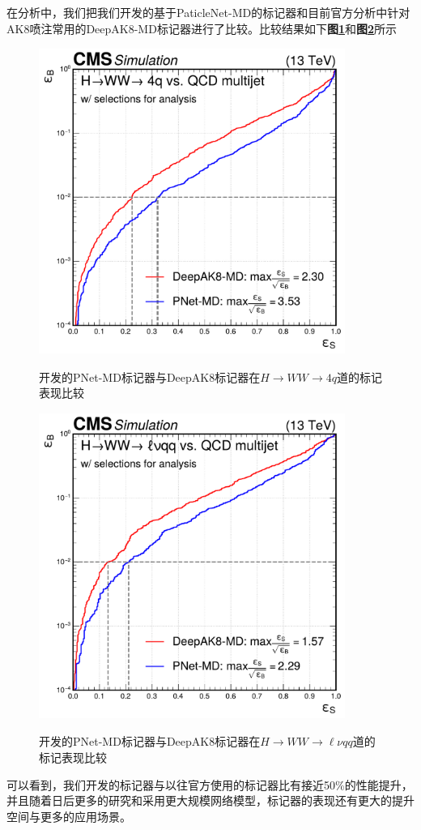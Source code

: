 在分析中，我们把我们开发的基于PaticleNet-MD的标记器和目前官方分析中针对AK8喷注常用的DeepAK8-MD标记器进行了比较。比较结果如下\textbf{图\ref{fig:5.6}}和\textbf{图\ref{fig:5.7}}所示
\begin{figure}[H]
 \centering\label{fig:5.6}
 \caption{开发的PNet-MD标记器与DeepAK8标记器在$H\to WW\to4q$道的标记表现比较}
 \includegraphics[height=10cm, width=10cm]{pictures/ana_roc_4q.pdf}
 \label{fig:5.6}
\end{figure}

\begin{figure}[H]
 \centering\label{fig:5.7}
 \caption{开发的PNet-MD标记器与DeepAK8标记器在$H\to WW\to\ell\nu qq$道的标记表现比较}
 \includegraphics[height=10cm, width=10cm]{pictures/ana_roc_2q.pdf}
 \label{fig:5.7}
\end{figure}
可以看到，我们开发的标记器与以往官方使用的标记器比有接近50\%的性能提升，并且随着日后更多的研究和采用更大规模网络模型，标记器的表现还有更大的提升空间与更多的应用场景。